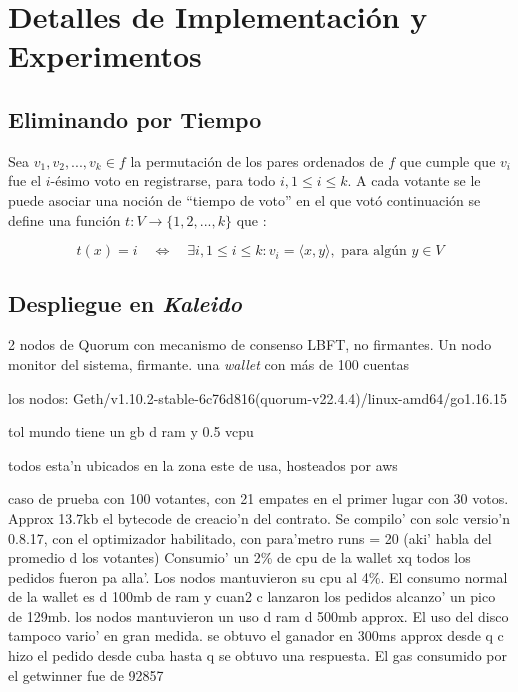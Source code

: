 \chapter{Detalles de Implementación y Experimentos}\label{chapter:implementation}
\section{Eliminando por Tiempo}
Sea $v_1, v_2, ..., v_k \in f$ la permutaci\'on de los pares ordenados de $f$ que cumple que $v_i$ fue el $i$-\'esimo voto en registrarse, para todo $i, 1 \leq i \leq k$. A cada votante se le puede asociar una noci\'on de ``tiempo de voto'' en el que vot\'o continuaci\'on se define una funci\'on $t: V \rightarrow \{1, 2, ..., k\}$ que :

$$
t(x) = i \quad \Leftrightarrow \quad \exists i, 1 \leq i \leq k: v_i = \langle x, y \rangle, \text{ para alg\'un } y \in V 
$$

\section{Despliegue en \textit{Kaleido}}
2 nodos de Quorum con mecanismo de consenso LBFT, no firmantes. Un nodo monitor del sistema, firmante. una \textit{wallet} con m\'as de 100 cuentas

los nodos: Geth/v1.10.2-stable-6c76d816(quorum-v22.4.4)/linux-amd64/go1.16.15

tol mundo tiene un gb d ram y 0.5 vcpu

todos esta'n ubicados en la zona este de usa, hosteados por aws

caso de prueba con 100 votantes, con 21 empates en el primer lugar con 30 votos. Approx 13.7kb el bytecode de creacio'n del contrato. Se compilo' con solc versio'n 0.8.17, con el optimizador habilitado, con para'metro runs = 20 (aki' habla  del promedio d los votantes)  Consumio' un 2\% de cpu de la wallet xq todos los pedidos fueron pa alla'. Los nodos mantuvieron su cpu al 4\%. El consumo normal de la wallet es d 100mb de ram y cuan2 c lanzaron los pedidos alcanzo' un pico de 129mb. los nodos mantuvieron un uso d ram d 500mb approx. El uso del disco tampoco vario' en gran medida. se obtuvo el ganador en 300ms approx desde q c hizo el pedido desde cuba hasta q se obtuvo una respuesta. El gas consumido por el getwinner fue de 92857